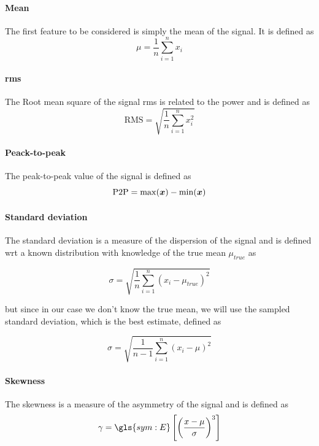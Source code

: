 \paragraph{Mean}
The first feature to be considered is simply the mean of the signal. It is defined as
\begin{equation}
    \mu = \frac{1}{n}\sum_{i=1}^n x_i
\end{equation}

\paragraph{\gls{rms}}
The Root mean square of the signal \gls{rms} is related to the power and is defined as
\begin{equation}
    \text{RMS} = \sqrt{\frac{1}{n}\sum_{i=1}^n x_i^2}
\end{equation}

\paragraph{Peack-to-peak}
The peak-to-peak value of the signal is defined as
\begin{equation}
    \text{P2P} = \max(\bm{x}) - \min(\bm{x})
\end{equation}

\paragraph{Standard deviation}
The standard deviation is a measure of the dispersion of the signal and is defined {\gls{wrt}} a known distribution with knowledge of the true mean $\mu_{true}$ as

\begin{equation}
    {\sigma} = \sqrt{\frac{1}{n}\sum_{i=1}^n (x_i - \mu_{true})^2}
\end{equation}

but since in our case we don't know the true mean, we will use the sampled standard deviation, which is the best estimate, defined as

\begin{equation}
    \hat{\sigma} = \sqrt{\frac{1}{n-1}\sum_{i=1}^n (x_i - \mu)^2}
\end{equation}

\paragraph{Skewness}
The skewness is a measure of the asymmetry of the signal and is defined as
\begin{equation}
    \gamma = \gls{sym:E}\left[ \left(\frac{x - \mu}{\sigma}\right)^3 \right]
\end{equation}

